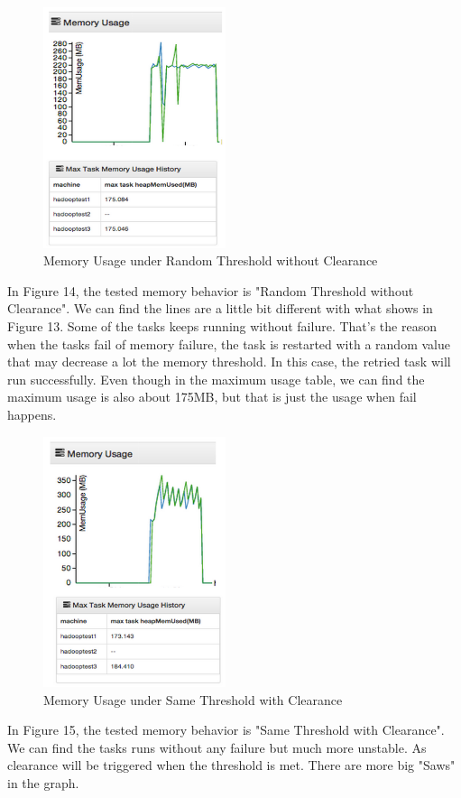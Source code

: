 \begin{figure}[ht]
  \centering
    \includegraphics[width=2.1in]{image/test1b.png}
    \caption{Memory Usage under Random Threshold without Clearance}
    \label{ref:test1b}
\end{figure}

In Figure 14, the tested memory behavior is "Random Threshold without Clearance". We can find the lines are a little bit different with what shows in Figure 13. Some of the tasks keeps running without failure. That's the reason when the tasks fail of memory failure, the task is restarted with a random value that may decrease a lot the memory threshold. In this case, the retried task will run successfully. Even though in the maximum usage table, we can find the maximum usage is also about 175MB, but that is just the usage when fail happens.

\begin{figure}[ht]
  \centering
    \includegraphics[width=2.1in]{image/test1c.png}
    \caption{Memory Usage under Same Threshold with Clearance}
    \label{ref:test1c}
\end{figure}

In Figure 15, the tested memory behavior is "Same Threshold with Clearance". We can find the tasks runs without any failure but much more unstable. As clearance will be triggered when the threshold is met. There are more big "Saws" in the graph.

